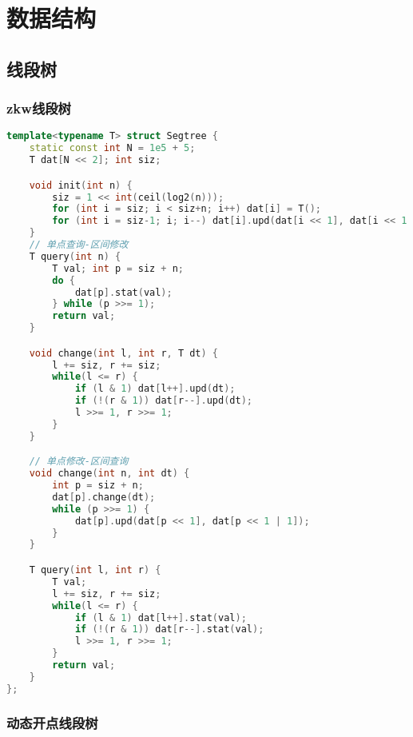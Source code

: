 

\section{数据结构}

\subsection{线段树}


\subsubsection{zkw线段树}

\begin{lstlisting}[language=C++]
template<typename T> struct Segtree {
    static const int N = 1e5 + 5;
    T dat[N << 2]; int siz;

    void init(int n) {
        siz = 1 << int(ceil(log2(n)));
        for (int i = siz; i < siz+n; i++) dat[i] = T();
        for (int i = siz-1; i; i--) dat[i].upd(dat[i << 1], dat[i << 1 | 1]);
    }
    // 单点查询-区间修改
    T query(int n) {
        T val; int p = siz + n;
        do {
            dat[p].stat(val);
        } while (p >>= 1);
        return val;
    }

    void change(int l, int r, T dt) {
        l += siz, r += siz;
        while(l <= r) {
            if (l & 1) dat[l++].upd(dt);
            if (!(r & 1)) dat[r--].upd(dt);
            l >>= 1, r >>= 1;
        }
    }

    // 单点修改-区间查询
    void change(int n, int dt) {
        int p = siz + n;
        dat[p].change(dt);
        while (p >>= 1) {
            dat[p].upd(dat[p << 1], dat[p << 1 | 1]);
        }
    }

    T query(int l, int r) {
        T val;
        l += siz, r += siz;
        while(l <= r) {
            if (l & 1) dat[l++].stat(val);
            if (!(r & 1)) dat[r--].stat(val);
            l >>= 1, r >>= 1;
        }
        return val;
    }
};
\end{lstlisting}

\subsubsection{动态开点线段树}


